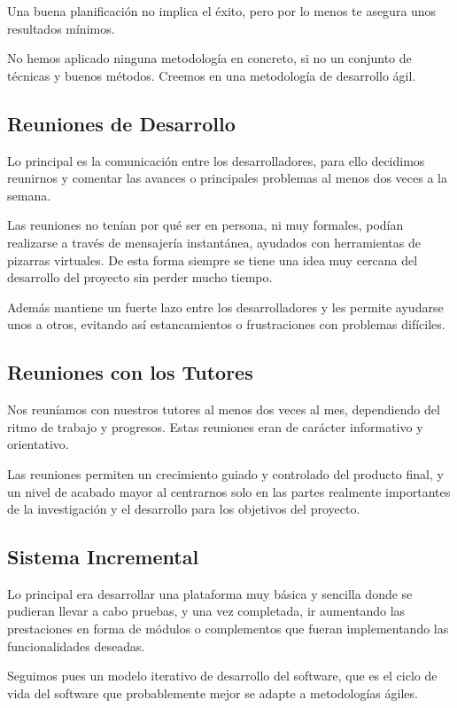 Una buena planificación no implica el éxito, pero por lo menos te asegura unos
resultados mínimos.

No hemos aplicado ninguna metodología en concreto, si no un conjunto de técnicas
y buenos métodos. Creemos en una metodología de desarrollo ágil.

\subsection*{Reuniones de Desarrollo}

Lo principal es la comunicación entre los desarrolladores, para ello decidimos
reunirnos y comentar las avances o principales problemas al menos dos veces a
la semana.

Las reuniones no tenían por qué ser en persona, ni muy formales, podían
realizarse a través de mensajería instantánea, ayudados con herramientas de
pizarras virtuales. De esta forma siempre se tiene una idea muy cercana del
desarrollo del proyecto sin perder mucho tiempo.

Además mantiene un fuerte lazo entre los desarrolladores y les permite ayudarse
unos a otros, evitando así estancamientos o frustraciones con problemas
difíciles.

\subsection*{Reuniones con los Tutores}

Nos reuníamos con nuestros tutores al menos dos veces al mes, dependiendo del
ritmo de trabajo y progresos. Estas reuniones eran de carácter informativo y
orientativo.

Las reuniones permiten un crecimiento guiado y controlado del producto final, y
un nivel de acabado mayor al centrarnos solo en las partes realmente importantes
de la investigación y el desarrollo para los objetivos del proyecto.

\subsection*{Sistema Incremental}

Lo principal era desarrollar una plataforma muy básica y sencilla donde se
pudieran llevar a cabo pruebas, y una vez completada, ir aumentando las
prestaciones en forma de módulos o complementos que fueran implementando las
funcionalidades deseadas.

Seguimos pues un modelo iterativo de desarrollo del software, que es el ciclo
de vida del software que probablemente mejor se adapte a metodologías ágiles.


